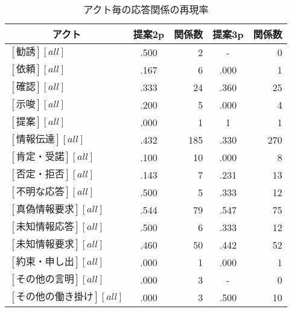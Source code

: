 \begin{table}[tbt]
\small
  \begin{center}
    \caption{アクト毎の応答関係の再現率}
    \label{tbl:res5.2.1}
    \begin{tabular}{|l|c|r||c|r|}
      \hline
       \multicolumn{1}{|c|}{アクト} & 提案2p & 関係数 & 提案3p & 関係数\\
      \hline
	  $[勧誘][all]$&.500&2		&-&0 \\
	  $[依頼][all]$&.167&6		&.000&1 \\
	  $[確認][all]$&.333&24		&.360&25 \\
	  $[示唆][all]$&.200&5		&.000&4 \\
	  $[提案][all]$&.000&1		&1&1 \\
	  $[情報伝達][all]$&.432&185	&.330&270 \\
	  $[肯定・受諾][all]$&.100&10	&.000&8 \\
	  $[否定・拒否][all]$&.143&7	&.231&13 \\
	  $[不明な応答][all]$&.500&5	&.333&12 \\
	  $[真偽情報要求][all]$&.544&79	&.547&75 \\
	  $[未知情報応答][all]$&.500&6	&.333&12 \\
	  $[未知情報要求][all]$&.460&50	&.442&52 \\
	  $[約束・申し出][all]$&.000&1	&.000&1 \\
	  $[その他の言明][all]$&.000&3	&-&0 \\
	  $[その他の働き掛け][all]$&.000&3	&.500&10 \\
      \hline
    \end{tabular}
  \end{center}
\end{table}

